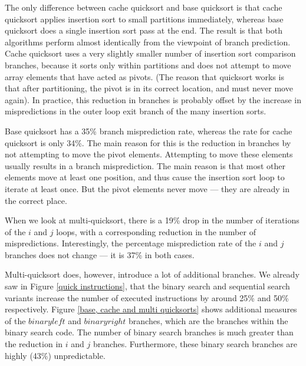 The only difference between cache quicksort and base quicksort is that
cache quicksort applies insertion sort to small partitions
immediately, whereas base quicksort does a single insertion sort pass
at the end. The result is that both algorithms perform almost
identically from the viewpoint of branch prediction. Cache quicksort
uses a very slightly smaller number of insertion sort comparison
branches, because it sorts only within partitions and does not attempt
to move array elements that have acted as pivots. (The reason that
quicksort works is that after partitioning, the pivot is in its
correct location, and must never move again). In practice, this
reduction in branches is probably offset by the increase in
mispredictions in the outer loop exit branch of the many insertion
sorts.

Base quicksort has a 35\% branch misprediction rate, whereas the rate
for cache quicksort is only 34\%. The main reason for this is the
reduction in branches by not attempting to move the pivot elements.
Attempting to move these elements usually results in a branch
misprediction. The main reason is that most other elements move at
least one position, and thus cause the insertion sort loop to iterate
at least once. But the pivot elements never move --- they are already
in the correct place.

When we look at multi-quicksort, there is a 19\% drop in the number of
iterations of the $i$ and $j$ loops, with a corresponding reduction in
the number of mispredictions. Interestingly, the percentage
misprediction rate of the $i$ and $j$ branches does not change --- it
is 37\% in both cases.



Multi-quicksort does, however, introduce a lot of additional
branches. We already saw in Figure \ref{quick instructions}, that the
binary search and sequential search variants increase the number of
executed instructions by around 25\% and 50\% respectively. Figure
\ref{base, cache and multi quicksorts} shows additional measures of the $binary
left$ and $binary right$ branches, which are the branches within the
binary search code. The number of binary search branches is much
greater than the reduction in $i$ and $j$ branches. Furthermore, these
binary search branches are highly (43\%) unpredictable.


